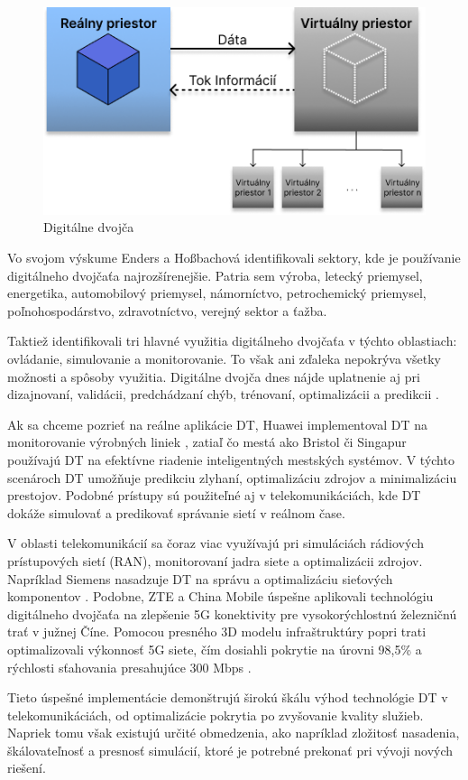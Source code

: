 \begin{figure}[H]
    \centering
    \includegraphics[width=0.85\linewidth]{assets/images/Grieves_PLM_model.png}
    \caption{Digitálne dvojča}
\end{figure}

\par{Vo  svojom výskume Enders a Hoßbachová \cite{DimensionOfDTAplication} identifikovali sektory, kde je používanie digitálneho dvojčaťa najrozšírenejšie. Patria sem výroba, letecký priemysel, energetika, automobilový priemysel, námorníctvo, petrochemický priemysel, poľnohospodárstvo, zdravotníctvo, verejný sektor a ťažba.
}
\par{Taktiež identifikovali tri hlavné využitia digitálneho dvojčaťa v týchto oblastiach: ovládanie, simulovanie a monitorovanie. To však ani zďaleka nepokrýva všetky možnosti a spôsoby využitia. Digitálne dvojča dnes nájde uplatnenie aj pri dizajnovaní, validácii, predchádzaní chýb, trénovaní, optimalizácii a predikcii \cite{AplicationsOfDT}.
}
\par{Ak sa chceme pozrieť na reálne aplikácie DT, Huawei implementoval DT na monitorovanie výrobných liniek \cite{huawei2020}, zatiaľ čo mestá ako Bristol \cite{Bristol} či Singapur \cite{singapur} používajú DT na efektívne riadenie inteligentných mestských systémov. V týchto scenároch DT umožňuje predikciu zlyhaní, optimalizáciu zdrojov a minimalizáciu prestojov. Podobné prístupy sú použiteľné aj v telekomunikáciách, kde DT dokáže simulovať a predikovať správanie sietí v reálnom čase. 
}
\par{V oblasti telekomunikácií sa čoraz viac využívajú pri simuláciách rádiových prístupových sietí (RAN), monitorovaní jadra siete a optimalizácii zdrojov. Napríklad Siemens nasadzuje DT na správu a optimalizáciu sieťových komponentov \cite{5g&beyond}. Podobne, ZTE a China Mobile úspešne aplikovali technológiu digitálneho dvojčaťa na zlepšenie 5G konektivity pre vysokorýchlostnú železničnú trať v južnej Číne. Pomocou presného 3D modelu infraštruktúry popri trati optimalizovali výkonnosť 5G siete, čím dosiahli pokrytie na úrovni 98,5\% a rýchlosti sťahovania presahujúce 300 Mbps \cite{ChinaMobile}. 
}
\par{ Tieto úspešné implementácie demonštrujú širokú škálu výhod technológie DT v telekomunikáciách, od optimalizácie pokrytia po zvyšovanie kvality služieb. Napriek tomu však existujú určité obmedzenia, ako napríklad zložitosť nasadenia, škálovateľnosť a presnosť simulácií, ktoré je potrebné prekonať pri vývoji nových riešení. 
}

